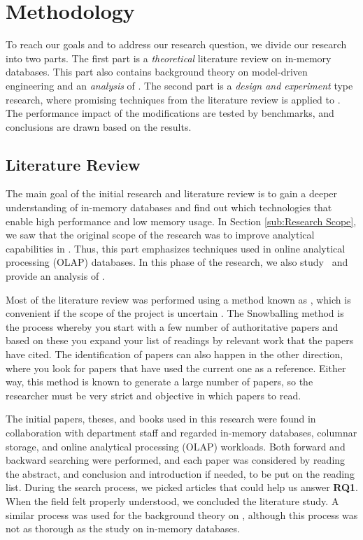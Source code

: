 \section{Methodology}
\label{sec:Methodology}
To reach our goals and to address our research question, we divide our research into two parts. The first part is a \textit{theoretical} literature review on in-memory databases. This part also contains background theory on model-driven engineering and an \textit{analysis} of \gap. The second part is a \textit{design and experiment} type research, where promising techniques from the literature review is applied to \gap. The performance impact of the modifications are tested by benchmarks, and conclusions are drawn based on the results.

\subsection{Literature Review}
\label{sub:Literature Review}
The main goal of the initial research and literature review is to gain a deeper understanding of in-memory databases and find out which technologies that enable high performance and low memory usage. In Section \ref{sub:Research Scope}, we saw that the original scope of the research was to improve analytical capabilities in \gap. Thus, this part emphasizes techniques used in online analytical processing (OLAP) databases. In this phase of the research, we also study \mde~and provide an analysis of \gap.

Most of the literature review was performed using a method known as , which is convenient if the scope of the project is uncertain \cite{Ang2014-nm}. The Snowballing method is the process whereby you start with a few number of authoritative papers and based on these you expand your list of readings by relevant work that the papers have cited. The identification of papers can also happen in the other direction, where you look for papers that have used the current one as a reference. Either way, this method is known to generate a large number of papers, so the researcher must be very strict and objective in which papers to read.

The initial papers, theses, and books used in this research were found in collaboration with department staff and regarded in-memory databases, columnar storage, and online analytical processing (OLAP) workloads. Both forward and backward searching were performed, and each paper was considered by reading the abstract, and conclusion and introduction if needed, to be put on the reading list. During the search process, we picked articles that could help us answer \textbf{RQ1}. When the field felt properly understood, we concluded the literature study. A similar process was used for the background theory on \mde, although this process was not as thorough as the study on in-memory databases.


